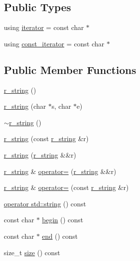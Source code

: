 \subsection*{Public Types}
\begin{DoxyCompactItemize}
\item 
using \hyperlink{structcrow_1_1json_1_1detail_1_1r__string_a3f1edea7d37fb9b1ae6b348787e3026f}{iterator} = const char $\ast$
\item 
using \hyperlink{structcrow_1_1json_1_1detail_1_1r__string_a7efeef8e8e48862b18217693ac68529d}{const\-\_\-iterator} = const char $\ast$
\end{DoxyCompactItemize}
\subsection*{Public Member Functions}
\begin{DoxyCompactItemize}
\item 
\hyperlink{structcrow_1_1json_1_1detail_1_1r__string_a2223afe7a9d4374a25b87495cc857eaa}{r\-\_\-string} ()
\item 
\hyperlink{structcrow_1_1json_1_1detail_1_1r__string_a83781200bd2f4a7547e776f14e6a7568}{r\-\_\-string} (char $\ast$s, char $\ast$e)
\item 
\hyperlink{structcrow_1_1json_1_1detail_1_1r__string_a7d91b49b42653bc18a8c03d666d705af}{$\sim$r\-\_\-string} ()
\item 
\hyperlink{structcrow_1_1json_1_1detail_1_1r__string_a3d4f439775bf61521c661a96b647ff0b}{r\-\_\-string} (const \hyperlink{structcrow_1_1json_1_1detail_1_1r__string}{r\-\_\-string} \&r)
\item 
\hyperlink{structcrow_1_1json_1_1detail_1_1r__string_a7b25d57ab7b1d9235ca113a67512af66}{r\-\_\-string} (\hyperlink{structcrow_1_1json_1_1detail_1_1r__string}{r\-\_\-string} \&\&r)
\item 
\hyperlink{structcrow_1_1json_1_1detail_1_1r__string}{r\-\_\-string} \& \hyperlink{structcrow_1_1json_1_1detail_1_1r__string_ae67f6ae5f2705cd1dd391bb939f53bc8}{operator=} (\hyperlink{structcrow_1_1json_1_1detail_1_1r__string}{r\-\_\-string} \&\&r)
\item 
\hyperlink{structcrow_1_1json_1_1detail_1_1r__string}{r\-\_\-string} \& \hyperlink{structcrow_1_1json_1_1detail_1_1r__string_a50a109ca9049b26afd6a6e5affc73fff}{operator=} (const \hyperlink{structcrow_1_1json_1_1detail_1_1r__string}{r\-\_\-string} \&r)
\item 
\hyperlink{structcrow_1_1json_1_1detail_1_1r__string_a4f3e640ace895a7ab7a01474c61644c2}{operator std\-::string} () const 
\item 
const char $\ast$ \hyperlink{structcrow_1_1json_1_1detail_1_1r__string_a4c61c59e3bb521fb1ecc11dc1e19b52c}{begin} () const 
\item 
const char $\ast$ \hyperlink{structcrow_1_1json_1_1detail_1_1r__string_a99984bd80bdc25d6264b56350ce6d431}{end} () const 
\item 
size\-\_\-t \hyperlink{structcrow_1_1json_1_1detail_1_1r__string_a18e9862751bc53b22edc498d46f6a2cf}{size} () const 
\end{DoxyCompactItemize}
